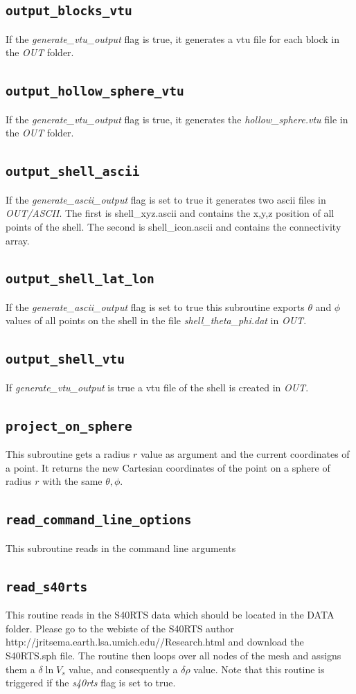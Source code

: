  \subsection{\tt output\_blocks\_vtu}
 If the {\sl generate\_vtu\_output} flag is true, 
 it generates a vtu file for each block in the {\sl OUT} folder.
 \subsection{\tt output\_hollow\_sphere\_vtu}
 If the {\sl generate\_vtu\_output} flag is true, 
 it generates the {\sl hollow\_sphere.vtu} file in the {\sl OUT} folder. 
 \subsection{\tt output\_shell\_ascii}
 If the {\sl generate\_ascii\_output} flag is set to true
 it generates two ascii files in {\sl OUT/ASCII}. 
 The first is shell\_xyz.ascii and contains the x,y,z position of all points of the shell.
 The second is shell\_icon.ascii and contains the connectivity array.
 \subsection{\tt output\_shell\_lat\_lon}
 If the {\sl generate\_ascii\_output} flag is set to true
 this subroutine exports $\theta$ and $\phi$ values of all points on the 
 shell in the file {\sl shell\_theta\_phi.dat} in {\sl OUT}.
 \subsection{\tt output\_shell\_vtu}
 If {\sl generate\_vtu\_output} is true 
 a vtu file of the shell is created in {\sl OUT}.
 \subsection{\tt project\_on\_sphere}
 This subroutine gets a radius $r$ value as argument and the current coordinates
 of a point. It returns the new Cartesian coordinates of the point on a sphere 
 of radius $r$ with the same $\theta,\phi$.
 \subsection{\tt read\_command\_line\_options}
 This subroutine reads in the command line arguments
 \subsection{\tt read\_s40rts}
 This routine reads in the S40RTS data which should be located in the DATA folder. 
 Please go to the webiste of the S40RTS author http://jritsema.earth.lsa.umich.edu//Research.html
 and download the S40RTS.sph file.
 The routine then loops over all nodes of the mesh and assigns them a $\delta \ln V_s$ value, 
 and consequently a $\delta \rho$ value.
 Note that this routine is triggered if the {\sl s40rts} flag is set to true.
